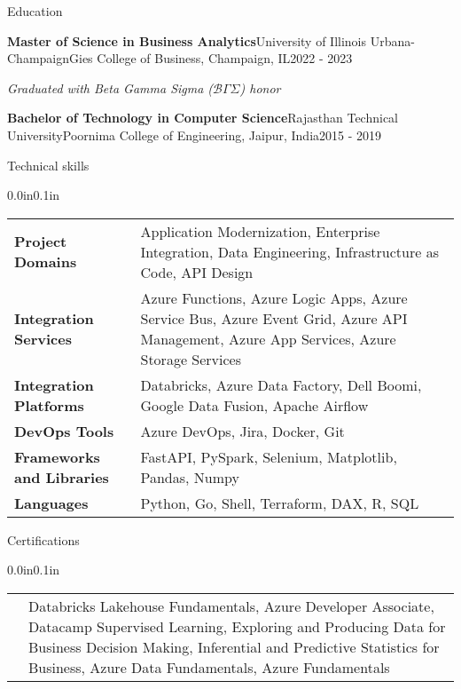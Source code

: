 \documentclass{resume} %
\makeatletter
\newcommand{\italicitem}[1]{\item{\textit{#1}}}
\newcommand{\entry}[2]{#1 & #2 \tabularnewline} %
\newcommand{\tableEnv}[2]{%
	\begin{rSection}{#1} %
		\begin{adjustwidth}{0.0in}{0.1in} %
			\begin{tabularx}{\linewidth}{@{} >{\bfseries}l @{\hspace{6ex}} X @{}}
				#2 %
			\end{tabularx}
		\end{adjustwidth}
	\end{rSection}
}
\makeatother
\begin{document}
	
	
	\begin{rSection}{Education}
		
		\begin{rSubsectionNoBullet}{\bf Master of Science in Business Analytics}{University of Illinois Urbana-Champaign}{Gies College of Business, Champaign, IL}{2022 - 2023}
			\italicitem{Graduated with Beta Gamma Sigma ($\mathcal{B}\Gamma\Sigma$) honor }
		\end{rSubsectionNoBullet}
		
		\begin{rSubsectionNoBullet}{\bf Bachelor of Technology in Computer Science}{Rajasthan Technical University}{Poornima College of Engineering, Jaipur, India}{2015 - 2019}
			\italicitem{}
		\end{rSubsectionNoBullet}
		
	\end{rSection}
	
	
	
	\tableEnv{Technical skills}{
		\entry{Project Domains}{Application Modernization, Enterprise Integration, Data Engineering, Infrastructure as Code, API Design}
		\entry{Integration Services}{Azure Functions, Azure Logic Apps, Azure Service Bus, Azure Event Grid, Azure API Management, Azure App Services, Azure Storage Services}
		\entry{Integration Platforms}{Databricks, Azure Data Factory, Dell Boomi, Google Data Fusion, Apache Airflow}
		\entry{DevOps Tools}{Azure DevOps, Jira, Docker, Git}
		\entry{Frameworks and Libraries}{FastAPI, PySpark, Selenium, Matplotlib, Pandas, Numpy}
		\entry{Languages}{Python, Go, Shell, Terraform, DAX, R, SQL}
	}
	
	
	\tableEnv{Certifications}{
		\entry{}{Databricks Lakehouse Fundamentals, Azure Developer Associate, Datacamp Supervised Learning, Exploring and Producing Data for Business Decision Making, Inferential and Predictive Statistics for Business, Azure Data Fundamentals, Azure Fundamentals}
	}
	
\end{document}
